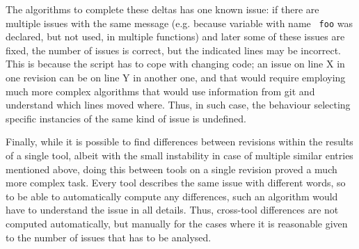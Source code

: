 The algorithms to complete these deltas has one known issue: if there are
multiple issues with the same message (e.g. because variable with name {\tt
				       foo} was declared, but not used, in
				       multiple functions) and later some of
these issues are fixed, the number of issues is correct, but the indicated
lines may be incorrect. This is because the script has to cope with changing
code; an issue on line X in one revision can be on line Y in another one, and
that would require employing much more complex algorithms that would use
information from git and understand which lines moved where. Thus, in such
case, the behaviour selecting specific instancies of the same kind of issue is
undefined.


%
%
%

Finally, while it is possible to find differences between revisions within the
results of a single tool, albeit with the small instability in case of multiple
similar entries mentioned above, doing this between tools on a single revision
proved a much more complex task. Every tool describes the same issue with
different words, so to be able to automatically compute any differences, such
an algorithm would have to understand the issue in all details. Thus,
   cross-tool differences are not computed automatically, but manually for the
   cases where it is reasonable given to the number of issues that has to be
   analysed.
